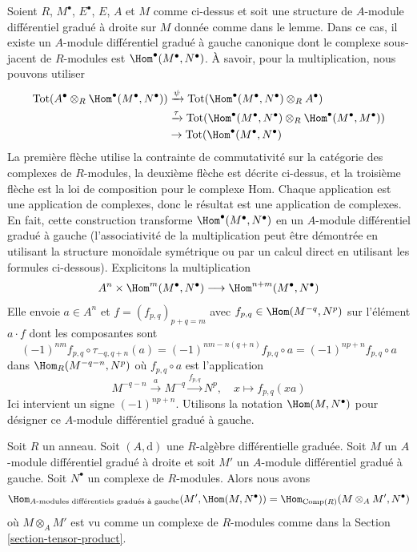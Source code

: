 \noindent
Soient $R$, $M^\bullet$, $E^\bullet$, $E$, $A$ et $M$ comme ci-dessus et soit une
structure de $A$-module différentiel gradué à droite sur $M$ donnée comme dans le
lemme. Dans ce cas, il existe un $A$-module différentiel gradué à gauche canonique
dont le complexe sous-jacent de $R$-modules est $\Hom^\bullet(M^\bullet,
N^\bullet)$. À savoir, pour la multiplication, nous pouvons utiliser
\begin{align*}
\text{Tot}(A^\bullet \otimes_R \Hom^\bullet(M^\bullet, N^\bullet))
& \xrightarrow{\psi}
\text{Tot}(\Hom^\bullet(M^\bullet, N^\bullet) \otimes_R A^\bullet) \\
& \xrightarrow{\tau}
\text{Tot}(\Hom^\bullet(M^\bullet, N^\bullet) \otimes_R
\Hom^\bullet(M^\bullet, M^\bullet)) \\
& \to
\text{Tot}(\Hom^\bullet(M^\bullet, N^\bullet)
\end{align*}
La première flèche utilise la contrainte de commutativité sur la catégorie des
complexes de $R$-modules, la deuxième flèche est décrite ci-dessus, et la
troisième flèche est la loi de composition pour le complexe Hom. Chaque
application est une application de complexes, donc le résultat est une application
de complexes. En fait, cette construction transforme $\Hom^\bullet(M^\bullet,
N^\bullet)$ en un $A$-module différentiel gradué à gauche (l’associativité de la
multiplication peut être démontrée en utilisant la structure monoïdale symétrique
ou par un calcul direct en utilisant les formules ci-dessous). Explicitons la
multiplication
$$
A^n \times \Hom^m(M^\bullet, N^\bullet) \longrightarrow
\Hom^{n + m}(M^\bullet, N^\bullet)
$$
Elle envoie $a \in A^n$ et $f = (f_{p, q})_{p + q = m}$ avec $f_{p, q} \in
\Hom(M^{-q}, N^p)$ sur l’élément $a \cdot f$ dont les composantes sont
$$
(-1)^{nm}f_{p, q} \circ \tau_{-q, q + n}(a) =
(-1)^{nm - n(q + n)}f_{p, q} \circ a =
(-1)^{np + n} f_{p, q} \circ a
$$
dans $\Hom_R(M^{-q - n}, N^p)$ où $f_{p, q} \circ a$ est l’application
$$
M^{-q - n} \xrightarrow{a} M^{-q} \xrightarrow{f_{p, q}} N^p,\quad
x \longmapsto f_{p, q}(xa)
$$
Ici intervient un signe $(-1)^{np + n}$. Utilisons la notation $\Hom(M,
N^\bullet)$ pour désigner ce $A$-module différentiel gradué à gauche.

\begin{lemma}
\label{lemma-characterize-hom-other-side}
Soit $R$ un anneau. Soit $(A, \text{d})$ une $R$-algèbre différentielle graduée.
Soit $M$ un $A$-module différentiel gradué à droite et soit $M'$ un $A$-module
différentiel gradué à gauche. Soit $N^\bullet$ un complexe de $R$-modules. Alors
nous avons
$$
\Hom_{\text{}A\text{-modules différentiels gradués à gauche}}(M', \Hom(M, N^\bullet)) =
\Hom_{\text{Comp}(R)}(M \otimes_A M', N^\bullet)
$$
où $M \otimes_A M'$ est vu comme un complexe de $R$-modules comme dans la Section
\ref{section-tensor-product}.
\end{lemma}


